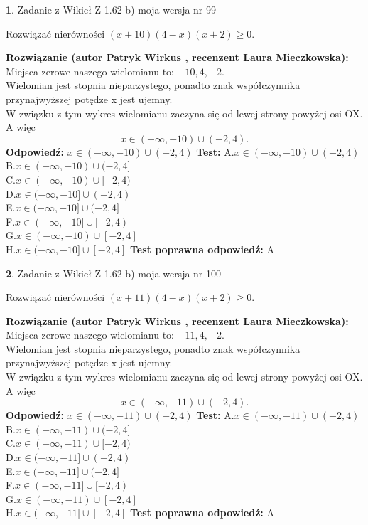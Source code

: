 \documentclass[12pt, a4paper]{article}
\theoremstyle{definition} %
\newtheorem{zad}{}
\newcommand{\zadStart}[1]{\begin{zad}#1\newline}
\newcommand{\zadStop}{\end{zad}}
\newcommand{\rozwStart}[2]{\noindent \textbf{Rozwiązanie (autor #1 , recenzent #2): }\newline}
\newcommand{\rozwStop}{\newline}
\newcommand{\odpStart}{\noindent \textbf{Odpowiedź:}\newline}
\newcommand{\odpStop}{\newline}
\newcommand{\testStart}{\noindent \textbf{Test:}\newline}
\newcommand{\testStop}{\newline}
\newcommand{\kluczStart}{\noindent \textbf{Test poprawna odpowiedź:}\newline}
\newcommand{\kluczStop}{\newline}
\begin{document}
\zadStart{Zadanie z Wikieł Z 1.62 b) moja wersja nr 99}

Rozwiązać nierówności $(x+10)(4-x)(x+2)\ge0$.
\zadStop
\rozwStart{Patryk Wirkus}{Laura Mieczkowska}
Miejsca zerowe naszego wielomianu to: $-10, 4, -2$.\\
Wielomian jest stopnia nieparzystego, ponadto znak współczynnika przy\linebreak najwyższej potędze x jest ujemny.\\ W związku z tym wykres wielomianu zaczyna się od lewej strony powyżej osi OX. A więc $$x \in (-\infty,-10) \cup (-2,4).$$
\rozwStop
\odpStart
$x \in (-\infty,-10) \cup (-2,4)$
\odpStop
\testStart
A.$x \in (-\infty,-10) \cup (-2,4)$\\
B.$x \in (-\infty,-10) \cup (-2,4]$\\
C.$x \in (-\infty,-10) \cup [-2,4)$\\
D.$x \in (-\infty,-10] \cup (-2,4)$\\
E.$x \in (-\infty,-10] \cup (-2,4]$\\
F.$x \in (-\infty,-10] \cup [-2,4)$\\
G.$x \in (-\infty,-10) \cup [-2,4]$\\
H.$x \in (-\infty,-10] \cup [-2,4]$
\testStop
\kluczStart
A
\kluczStop



\zadStart{Zadanie z Wikieł Z 1.62 b) moja wersja nr 100}

Rozwiązać nierówności $(x+11)(4-x)(x+2)\ge0$.
\zadStop
\rozwStart{Patryk Wirkus}{Laura Mieczkowska}
Miejsca zerowe naszego wielomianu to: $-11, 4, -2$.\\
Wielomian jest stopnia nieparzystego, ponadto znak współczynnika przy\linebreak najwyższej potędze x jest ujemny.\\ W związku z tym wykres wielomianu zaczyna się od lewej strony powyżej osi OX. A więc $$x \in (-\infty,-11) \cup (-2,4).$$
\rozwStop
\odpStart
$x \in (-\infty,-11) \cup (-2,4)$
\odpStop
\testStart
A.$x \in (-\infty,-11) \cup (-2,4)$\\
B.$x \in (-\infty,-11) \cup (-2,4]$\\
C.$x \in (-\infty,-11) \cup [-2,4)$\\
D.$x \in (-\infty,-11] \cup (-2,4)$\\
E.$x \in (-\infty,-11] \cup (-2,4]$\\
F.$x \in (-\infty,-11] \cup [-2,4)$\\
G.$x \in (-\infty,-11) \cup [-2,4]$\\
H.$x \in (-\infty,-11] \cup [-2,4]$
\testStop
\kluczStart
A
\kluczStop
\end{document}
